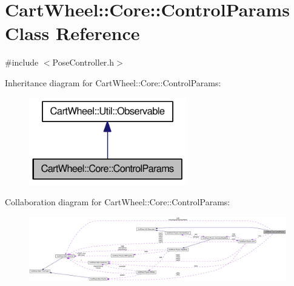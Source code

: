 \hypertarget{classCartWheel_1_1Core_1_1ControlParams}{
\section{CartWheel::Core::ControlParams Class Reference}
\label{classCartWheel_1_1Core_1_1ControlParams}
}


{\ttfamily \#include $<$PoseController.h$>$}



Inheritance diagram for CartWheel::Core::ControlParams:\nopagebreak
\begin{figure}[H]
\begin{center}
\leavevmode
\includegraphics[width=194pt]{classCartWheel_1_1Core_1_1ControlParams__inherit__graph}
\end{center}
\end{figure}


Collaboration diagram for CartWheel::Core::ControlParams:\nopagebreak
\begin{figure}[H]
\begin{center}
\leavevmode
\includegraphics[width=400pt]{classCartWheel_1_1Core_1_1ControlParams__coll__graph}
\end{center}
\end{figure}
